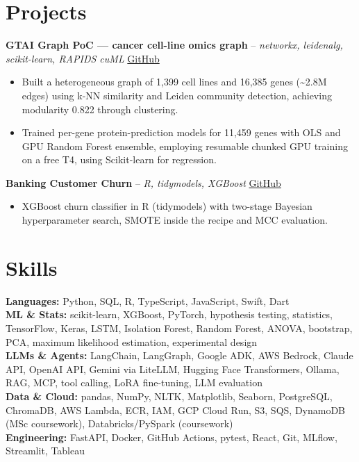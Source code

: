 \documentclass[a4paper,10pt]{article}
\begin{document}
\section{Projects}
\noindent\textbf{GTAI Graph PoC — cancer cell-line omics graph} -- \textit{networkx, leidenalg, scikit-learn, RAPIDS cuML} \hfill \href{https://github.com/Thiruvel-AP/GTAI-GraphPOC}{GitHub}
\begin{itemize}
  \item Built a heterogeneous graph of 1,399 cell lines and 16,385 genes (\textasciitilde{}2.8M edges) using k-NN similarity and Leiden community detection, achieving modularity 0.822 through clustering.
  \item Trained per-gene protein-prediction models for 11,459 genes with OLS and GPU Random Forest ensemble, employing resumable chunked GPU training on a free T4, using Scikit-learn for regression.
\end{itemize}
\noindent\textbf{Banking Customer Churn} -- \textit{R, tidymodels, XGBoost} \hfill \href{https://github.com/Thiruvel-AP/Banking-Customer-Churn-Prediction}{GitHub}
\begin{itemize}
  \item XGBoost churn classifier in R (tidymodels) with two-stage Bayesian hyperparameter search, SMOTE inside the recipe and MCC evaluation.
\end{itemize}

\section{Skills}
\textbf{Languages:} Python, SQL, R, TypeScript, JavaScript, Swift, Dart\\
\textbf{ML \& Stats:} scikit-learn, XGBoost, PyTorch, hypothesis testing, statistics, TensorFlow, Keras, LSTM, Isolation Forest, Random Forest, ANOVA, bootstrap, PCA, maximum likelihood estimation, experimental design\\
\textbf{LLMs \& Agents:} LangChain, LangGraph, Google ADK, AWS Bedrock, Claude API, OpenAI API, Gemini via LiteLLM, Hugging Face Transformers, Ollama, RAG, MCP, tool calling, LoRA fine-tuning, LLM evaluation\\
\textbf{Data \& Cloud:} pandas, NumPy, NLTK, Matplotlib, Seaborn, PostgreSQL, ChromaDB, AWS Lambda, ECR, IAM, GCP Cloud Run, S3, SQS, DynamoDB (MSc coursework), Databricks/PySpark (coursework)\\
\textbf{Engineering:} FastAPI, Docker, GitHub Actions, pytest, React, Git, MLflow, Streamlit, Tableau
\end{document}
